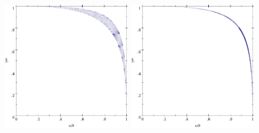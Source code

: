 \renewcommand{\subfigurewidth}{2.15in}
\begin{figure}[tb!]\centering%
\includegraphics[width=\subfigurewidth]{results/normal-normal-2-points}%
\includegraphics[width=\subfigurewidth]{results/normal-normal-01-points}%

\end{figure}
